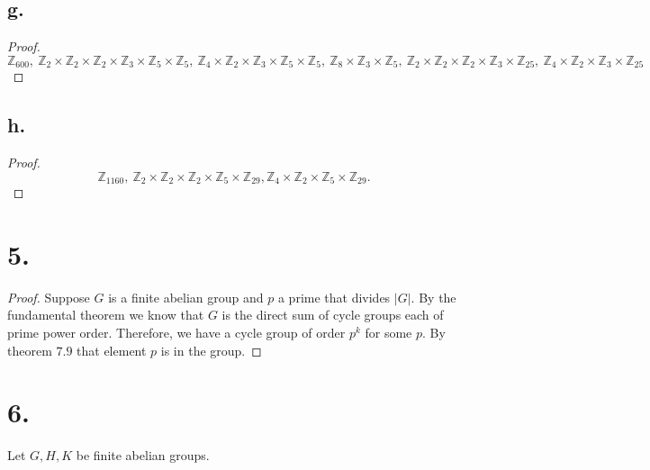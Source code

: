\documentclass{article}
\begin{document}
\subsection*{g.}
\begin{proof}
    \[
    \mathbb{Z}_{600}, \ \mathbb{Z}_2 \times \mathbb{Z}_2 \times \mathbb{Z}_2 \times \mathbb{Z}_3 \times \mathbb{Z}_5 \times \mathbb{Z}_5, \ \mathbb{Z}_4 \times \mathbb{Z}_2 \times \mathbb{Z}_3 \times \mathbb{Z}_5 \times \mathbb{Z}_5, \ \mathbb{Z}_8 \times \mathbb{Z}_3 \times \mathbb{Z}_5, \ \mathbb{Z}_2 \times \mathbb{Z}_2 \times \mathbb{Z}_2 \times \mathbb{Z}_3 \times \mathbb{Z}_{25}, \ \mathbb{Z}_4 \times \mathbb{Z}_2 \times \mathbb{Z}_3 \times \mathbb{Z}_25
    \]
\end{proof}
\subsection*{h.}
\begin{proof}
    \[
    \mathbb{Z}_{1160}, \  \mathbb{Z}_2 \times \mathbb{Z}_2 \times \mathbb{Z}_2 \times \mathbb{Z}_5 \times \mathbb{Z}_{29}, \mathbb{Z}_4 \times \mathbb{Z}_2 \times \mathbb{Z}_{5} \times \mathbb{Z}_{29}.     
    \]
\end{proof}

\section*{5.}
\begin{proof}
    Suppose $G$ is a finite abelian group and $p$ a prime that divides $|G|$. By the fundamental theorem we know that $G$ is the direct sum of cycle groups each of prime power order. Therefore, we have a cycle group of order $p^k$ for some $p$. By theorem $7.9$ that element $p$ is in the group. 
\end{proof}

\section*{6.}
Let $G, H, K$ be finite abelian groups. 
\end{document}
